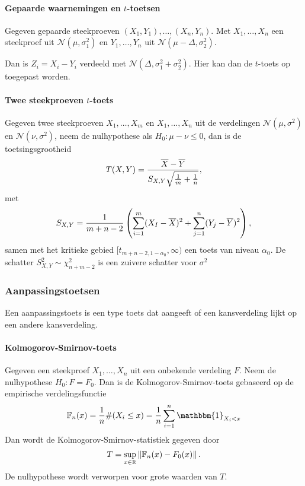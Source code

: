 \paragraph{Gepaarde waarnemingen en \texorpdfstring{\(t\)}{t}-toetsen}
Gegeven gepaarde steekproeven \((X_{1},Y_{1}),\dots,(X_{n},Y_{n})\). Met
\(X_{1},\dots,X_{n}\) een steekproef uit \(\mathcal{N}(\mu,\sigma_{1}^{2})\) en
\(Y_{1},\dots,Y_{n}\) uit \(\mathcal{N}(\mu-\Delta,\sigma_{2}^{2})\).

Dan is \(Z_{i}=X_{i}-Y_{i}\) verdeeld met
\(\mathcal{N}(\Delta,\sigma_{1}^{2}+\sigma_{2}^{2})\). Hier kan dan de
\(t\)-toets op toegepast worden.

\paragraph{Twee steekproeven \texorpdfstring{\(t\)}{t}-toets} Gegeven twee
steekproeven \(X_{1},\dots,X_{m}\) en \(X_{1},\dots,X_{n}\) uit de verdelingen
\(\mathcal{N}(\mu,\sigma^{2})\) en \(\mathcal{N}(\nu,\sigma^{2})\), neem de
nulhypothese als \(H_{0}:\mu-\nu\leq0\), dan is de toetsingsgrootheid
\[
    T(X,Y)=\frac{\overline{X}-\overline{Y}}{S_{X,Y}\sqrt{\frac{1}{m}+\frac{1}{n}}},
\]
met
\[
    S_{X,Y}=\frac{1}{m+n-2}\left(\sum_{i=1}^{m}(X_{I}-\overline{X})^{2}
    +\sum_{j=1}^{n}(Y_{j}-\overline{Y})^{2}\right),
\]
samen met het kritieke gebied \([t_{m+n-2,1-\alpha_{0}},\infty)\) een toets van
niveau \(\alpha_{0}\). De schatter \(S_{X,Y}^{2}\sim\chi^{2}_{n+m-2}\) is een zuivere schatter voor
\(\sigma^{2}\)

\subsubsection{Aanpassingstoetsen}
Een aanpassingstoets is een type toets dat aangeeft of een kansverdeling lijkt
op een andere kansverdeling.

\paragraph{Kolmogorov-Smirnov-toets}
Gegeven een steekproef \(X_{1},\dots,X_{n}\) uit een onbekende verdeling \(F\).
Neem de nulhypothese \(H_{0}:F=F_{0}\). Dan is de Kolmogorov-Smirnov-toets
gebaseerd op de empirische verdelingsfunctie
\[
    \mathbb{F}_{n}(x)=\frac{1}{n}\#(X_{i}\leq x)=
    \frac{1}{n}\sum_{i=1}^{n}\mathbbm{1}_{X_{i}<x}
\]
Dan wordt de Kolmogorov-Smirnov-statistiek gegeven door
\[
    T=\sup_{x\in\mathbb{R}}\left\|\mathbb{F}_{n}(x)-F_{0}(x)\right\|.
\]
De nulhypothese wordt verworpen voor grote waarden van \(T\).

